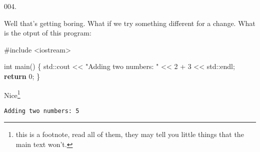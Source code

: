 \documentclass[]{article}
\newenvironment{Shaded}{}{}
\newcommand{\BuiltInTok}[1]{#1}
\newcommand{\ControlFlowTok}[1]{\textcolor[rgb]{0.00,0.44,0.13}{\textbf{#1}}}
\newcommand{\DataTypeTok}[1]{\textcolor[rgb]{0.56,0.13,0.00}{#1}}
\newcommand{\DecValTok}[1]{\textcolor[rgb]{0.25,0.63,0.44}{#1}}
\newcommand{\ImportTok}[1]{#1}
\newcommand{\NormalTok}[1]{#1}
\newcommand{\PreprocessorTok}[1]{\textcolor[rgb]{0.74,0.48,0.00}{#1}}
\newcommand{\StringTok}[1]{\textcolor[rgb]{0.25,0.44,0.63}{#1}}
\begin{document}
\noindent
{\tiny 004.}\\
\begin{minipage}[t]{.485\linewidth}

Well that's getting boring. What if we try something different for a
change. What is the otput of this program:

\begin{framed}

\begin{Shaded}
\begin{Highlighting}[]
\PreprocessorTok{#include }\ImportTok{<iostream>}

\DataTypeTok{int}\NormalTok{ main()}
\NormalTok{\{}
  \BuiltInTok{std::}\NormalTok{cout << }\StringTok{"Adding two numbers: "}
\NormalTok{            << }\DecValTok{2}\NormalTok{ + }\DecValTok{3}
\NormalTok{            << }\BuiltInTok{std::}\NormalTok{endl;}
  \ControlFlowTok{return} \DecValTok{0}\NormalTok{;}
\NormalTok{\}}
\end{Highlighting}
\end{Shaded}

\end{framed}

\end{minipage}
\hfill
\begin{minipage}[t]{.485\linewidth}

Nice\footnote{this is a footnote, read all of them, they may tell you
  little things that the main text won't.}

\begin{framed}

\begin{verbatim}
Adding two numbers: 5
\end{verbatim}

\end{framed}

\end{minipage}

\vspace{2mm}\noindent\hrulefill{}
\end{document}
